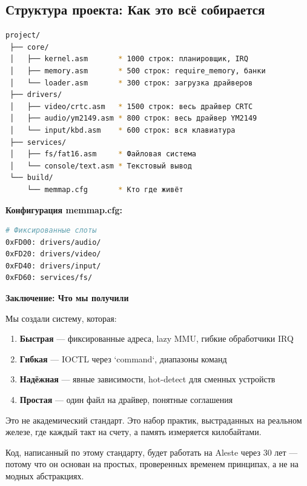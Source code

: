 \documentclass[11pt,a4paper]{scrartcl}
\begin{document}
\subsection{Структура проекта: Как это всё собирается}
\label{sec:orga64a246}

\begin{lstlisting}[language=bash,numbers=none]
project/
 ├── core/
 │   ├── kernel.asm       * 1000 строк: планировщик, IRQ
 │   ├── memory.asm       * 500 строк: require_memory, банки
 │   └── loader.asm       * 300 строк: загрузка драйверов
 ├── drivers/
 │   ├── video/crtc.asm   * 1500 строк: весь драйвер CRTC
 │   ├── audio/ym2149.asm * 800 строк: весь драйвер YM2149
 │   └── input/kbd.asm    * 600 строк: вся клавиатура
 ├── services/
 │   ├── fs/fat16.asm     * Файловая система
 │   └── console/text.asm * Текстовый вывод
 └── build/
     └── memmap.cfg       * Кто где живёт
\end{lstlisting}

\textbf{Конфигурация memmap.cfg:}

\begin{lstlisting}[language=bash,numbers=none]
# Фиксированные слоты
0xFD00: drivers/audio/
0xFD20: drivers/video/  
0xFD40: drivers/input/
0xFD60: services/fs/
\end{lstlisting}

\textbf{Заключение: Что мы получили}

Мы создали систему, которая:

\begin{enumerate}
\item \textbf{Быстрая} — фиксированные адреса, lazy MMU, гибкие обработчики IRQ
\item \textbf{Гибкая} — IOCTL через `command`, диапазоны команд
\item \textbf{Надёжная} — явные зависимости, hot-detect для сменных устройств
\item \textbf{Простая} — один файл на драйвер, понятные соглашения
\end{enumerate}

Это не академический стандарт. Это набор практик, выстраданных на реальном железе, где каждый такт на счету, а память измеряется килобайтами.

Код, написанный по этому стандарту, будет работать на Aleste через 30 лет — потому что он основан на простых, проверенных временем принципах, а не на модных абстракциях.
\end{document}
